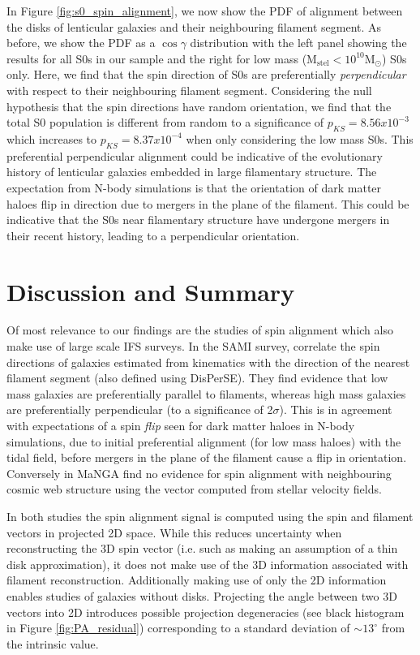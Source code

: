 In Figure \ref{fig:s0_spin_alignment}, we now show the PDF of alignment between the disks of lenticular galaxies and their neighbouring filament segment. As before, we show the PDF as a $\cos \gamma$ distribution with the left panel showing the results for all S0s in our sample and the right for low mass ($\mathrm{M_{stel} < 10^{10} M_{\odot}}$) S0s only. Here, we find that the spin direction of S0s are preferentially \textit{perpendicular} with respect to their neighbouring filament segment. Considering the null hypothesis that the spin directions have random orientation, we find that the total S0 population is different from random to a significance of $p_{KS} = 8.56 x 10^{-3}$ which increases to  $p_{KS} = 8.37 x 10^{-4}$ when only considering the low mass S0s. This preferential perpendicular alignment could be indicative of the evolutionary history of lenticular galaxies embedded in large filamentary structure. The expectation from N-body simulations is that the orientation of dark matter haloes flip in direction due to mergers in the plane of the filament. This could be indicative that the S0s near filamentary structure have undergone mergers in their recent history, leading to a perpendicular orientation. 

\section{Discussion and Summary} \label{sec:cw_spin_conclusion}
Of most relevance to our findings are the studies of spin alignment which also make use of large scale IFS surveys. In the SAMI survey, \citet{welker2020} correlate the spin directions of galaxies estimated from kinematics with the direction of the nearest filament segment (also defined using DisPerSE). They find evidence that low mass galaxies are preferentially parallel to filaments, whereas high mass galaxies are preferentially perpendicular (to a significance of 2$\sigma$). This is in agreement with expectations of a spin \textit{flip} seen for dark matter haloes in N-body simulations, due to initial preferential alignment (for low mass haloes) with the tidal field, before mergers in the plane of the filament cause a flip in orientation. Conversely in MaNGA \citet{krolewski2019} find no evidence for spin alignment with neighbouring cosmic web structure using the vector computed from stellar velocity fields. 

In both studies the spin alignment signal is computed using the spin and filament vectors in projected 2D space. While this reduces uncertainty when reconstructing the 3D spin vector (i.e. such as making an assumption of a thin disk approximation), it does not make use of the 3D information associated with filament reconstruction. Additionally making use of only the 2D information enables studies of galaxies without disks. Projecting the angle between two 3D vectors into 2D introduces possible projection degeneracies (see black histogram in Figure \ref{fig:PA_residual}) corresponding to a standard deviation of $\sim 13^{\circ}$ from the intrinsic value.

